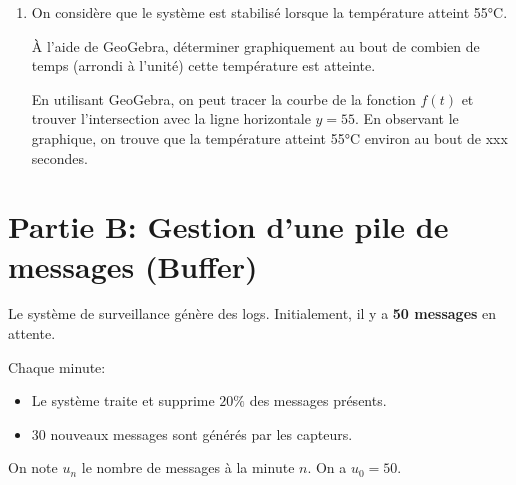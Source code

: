 \documentclass[11pt, a4paper]{report}
\begin{document}
\begin{enumerate}
    \medskip

    \item On considère que le système est stabilisé lorsque la température atteint 55°C.
    
    À l'aide de GeoGebra, déterminer graphiquement au bout de combien de temps (arrondi à l'unité) cette température est atteinte.
    
    \begin{blocvisiblex}[height=3]
        {\quad}
        En utilisant GeoGebra, on peut tracer la courbe de la fonction $f(t)$ et trouver l'intersection avec la ligne horizontale $y = 55$. En observant le graphique, on trouve que la température atteint 55°C environ au bout de xxx secondes.
    \end{blocvisiblex}
    
    \appelprof{}
\end{enumerate}

\pagebreak

\section*{Partie B\@: Gestion d'une pile de messages (Buffer) }


Le système de surveillance génère des logs. Initialement, il y a \textbf{50 messages} en attente.

Chaque minute:
\begin{itemize}
    \item Le système traite et supprime $20 \%$ des messages présents.
    \item 30 nouveaux messages sont générés par les capteurs.
\end{itemize}


On note $u_n$ le nombre de messages à la minute $n$. On a $u_0 = 50$.

\medskip
\end{document}
